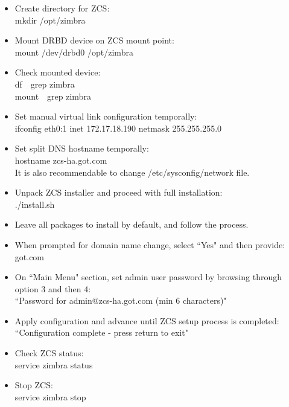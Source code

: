 \documentclass[a4paper, 12pt]{book}
\begin{document}
\begin{itemize}
	\item Create directory for ZCS:\\
		mkdir   /opt/zimbra
	
	\item Mount DRBD device on ZCS mount point:\\
		mount   /dev/drbd0   /opt/zimbra
	
	\item Check mounted device:\\
		df\  \textbar \ grep zimbra\\
		mount\  \textbar \ grep zimbra
	
	\item Set manual virtual link configuration temporally:\\
		ifconfig eth0:1 inet 172.17.18.190 netmask 255.255.255.0
	
	\item Set split DNS hostname temporally:\\
		hostname zcs-ha.got.com\\
		It is also recommendable to change /etc/sysconfig/network file.
	
	\item Unpack ZCS installer and proceed with full installation:\\
		./install.sh
	
	\item Leave all packages to install by default, and follow the process.
	
	\item When prompted for domain name change, select ``Yes" and then provide: got.com
	
	\item On ``Main Menu" section, set admin user password by browsing through option 3 and then 4:\\
		``Password for admin@zcs-ha.got.com (min 6 characters)"
	
	\item Apply configuration and advance until ZCS setup process is completed:\\
		``Configuration complete - press return to exit"
	
	\item Check ZCS status:\\
		service zimbra status
	
	\item Stop ZCS:\\	
		service zimbra stop
	

\end{itemize}
\end{document}
